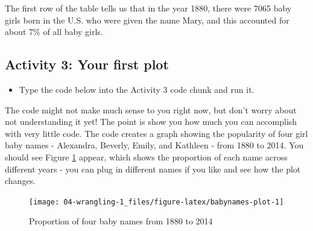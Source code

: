 \documentclass[]{book}
\newenvironment{Shaded}{\begin{snugshade}}{\end{snugshade}}
\newcommand{\DataTypeTok}[1]{\textcolor[rgb]{0.13,0.29,0.53}{#1}}
\newcommand{\KeywordTok}[1]{\textcolor[rgb]{0.13,0.29,0.53}{\textbf{#1}}}
\newcommand{\NormalTok}[1]{#1}
\newcommand{\OperatorTok}[1]{\textcolor[rgb]{0.81,0.36,0.00}{\textbf{#1}}}
\newcommand{\StringTok}[1]{\textcolor[rgb]{0.31,0.60,0.02}{#1}}
\providecommand{\tightlist}{%
  \setlength{\itemsep}{0pt}\setlength{\parskip}{0pt}}
\begin{document}
The first row of the table tells us that in the year 1880, there were 7065 baby girls born in the U.S. who were given the name Mary, and this accounted for about 7\% of all baby girls.

\hypertarget{activity-3-your-first-plot}{%
\subsection{Activity 3: Your first plot}\label{activity-3-your-first-plot}}

\begin{itemize}
\tightlist
\item
  Type the code below into the Activity 3 code chunk and run it.
\end{itemize}

The code might not make much sense to you right now, but don't worry about not understanding it yet! The point is show you how much you can accomplish with very little code. The code creates a graph showing the popularity of four girl baby names - Alexandra, Beverly, Emily, and Kathleen - from 1880 to 2014. You should see Figure \ref{fig:babynames-plot} appear, which shows the proportion of each name across different years - you can plug in different names if you like and see how the plot changes.

\begin{Shaded}
\end{Shaded}

\begin{figure}

{\centering \texttt{[image: 04-wrangling-1\_files/figure-latex/babynames-plot-1]} 

}

\caption{Proportion of four baby names from 1880 to 2014}\label{fig:babynames-plot}
\end{figure}
\end{document}
